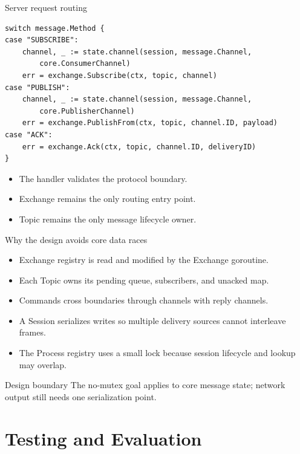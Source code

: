 \documentclass[aspectratio=169,10pt]{beamer}
\begin{document}
\begin{frame}[fragile]{Server request routing}
  \begin{lstlisting}[style=go]
switch message.Method {
case "SUBSCRIBE":
    channel, _ := state.channel(session, message.Channel,
        core.ConsumerChannel)
    err = exchange.Subscribe(ctx, topic, channel)
case "PUBLISH":
    channel, _ := state.channel(session, message.Channel,
        core.PublisherChannel)
    err = exchange.PublishFrom(ctx, topic, channel.ID, payload)
case "ACK":
    err = exchange.Ack(ctx, topic, channel.ID, deliveryID)
}
  \end{lstlisting}
  \begin{itemize}
    \item The handler validates the protocol boundary.
    \item Exchange remains the only routing entry point.
    \item Topic remains the only message lifecycle owner.
  \end{itemize}
\end{frame}

\begin{frame}{Why the design avoids core data races}
  \begin{itemize}
    \item Exchange registry is read and modified by the Exchange goroutine.
    \item Each Topic owns its pending queue, subscribers, and unacked map.
    \item Commands cross boundaries through channels with reply channels.
    \item A Session serializes writes so multiple delivery sources cannot interleave frames.
    \item The Process registry uses a small lock because session lifecycle and lookup may overlap.
  \end{itemize}
  \vspace{.5em}
  \begin{block}{Design boundary}
    The no-mutex goal applies to core message state; network output still needs
    one serialization point.
  \end{block}
\end{frame}

\section{Testing and Evaluation}
\end{document}
